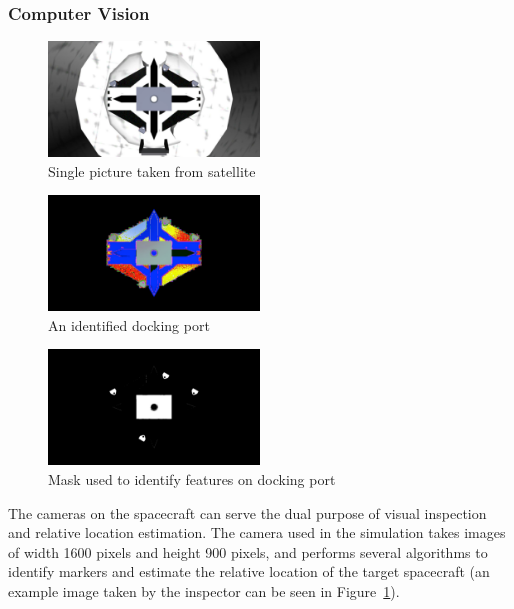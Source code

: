 \documentclass[journal, 10pt]{IEEEtran}
\begin{document}
\subsubsection{Computer Vision} \label{cv}
\begin{figure}[tbh]
\begin{center}
\includegraphics[width=0.5\textwidth]{figures/DockingPort.pdf}
\caption{Single picture taken from satellite}
\label{docking_port}
\end{center}
\end{figure}

\begin{figure}[tbh]
\begin{center}
\includegraphics[width=0.5\textwidth]{figures/DockingPortSubtraction.pdf}
\caption{An identified docking port}
\label{docking_port_subtraction}
\end{center}
\end{figure}

\begin{figure}[tbh]
\begin{center}
\includegraphics[width=0.5\textwidth]{figures/DockingPortFeatures.pdf}
\caption{Mask used to identify features on docking port}
\label{docking_port_features}
\end{center}
\end{figure}

The cameras on the spacecraft can serve the dual purpose of visual inspection and relative location estimation. The camera used in the simulation takes images of width 1600 pixels and height 900 pixels, and performs several algorithms to identify markers and estimate the relative location of the target spacecraft (an example image taken by the inspector can be seen in Figure~\ref{docking_port}).
\end{document}
